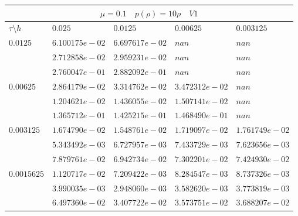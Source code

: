 \documentclass[a4paper,12pt]{extarticle}
\begin{document}
\begin{tabular}{|l|l|l|l|l|}
	\hline
	\multicolumn{5}{|c|}{$\mu =0.1 \quad  p(\rho) =10 \rho \quad V1$}\\
	\hline
	$\tau\setminus h$ & $0.025$ & $0.0125$ & $0.00625$ & $0.003125$\\
	\hline
	$0.0125$  & $6.100175e-02$ & $6.697617e-02$ & $nan$ & $nan$\\
	& $2.712858e-02$ & $2.959231e-02$ & $nan$ & $nan$\\
	& $2.760047e-01$ & $2.882092e-01$ & $nan$ & $nan$\\
	\hline
	$0.00625$  & $2.864179e-02$ & $3.314762e-02$ & $3.472312e-02$ & $nan$\\
	& $1.204621e-02$ & $1.436055e-02$ & $1.507141e-02$ & $nan$\\
	& $1.365712e-01$ & $1.425215e-01$ & $1.468490e-01$ & $nan$\\
	\hline
	$0.003125$  & $1.674790e-02$ & $1.548761e-02$ & $1.719097e-02$ & $1.761749e-02$\\
	& $5.343492e-03$ & $6.727957e-03$ & $7.433729e-03$ & $7.623656e-03$\\
	& $7.879761e-02$ & $6.942734e-02$ & $7.302201e-02$ & $7.424930e-02$\\
	\hline
	$0.0015625$  & $1.120717e-02$ & $7.209422e-03$ & $8.284547e-03$ & $8.737326e-03$\\
	& $3.990035e-03$ & $2.948060e-03$ & $3.582620e-03$ & $3.773819e-03$\\
	& $6.497360e-02$ & $3.407722e-02$ & $3.573751e-02$ & $3.688207e-02$\\
	\hline
\end{tabular}
\end{document}
